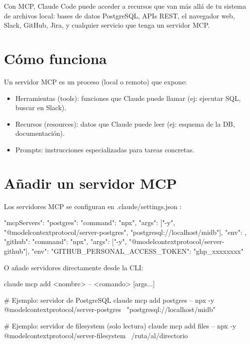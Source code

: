 \documentclass[11pt,a4paper]{book}
\begin{document}
Con MCP, Claude Code puede acceder a recursos que van más allá de tu sistema de archivos local: bases de datos PostgreSQL, APIs REST, el navegador web, Slack, GitHub, Jira, y cualquier servicio que tenga un servidor MCP.

\section{Cómo funciona}
Un servidor MCP es un proceso (local o remoto) que expone:

\begin{itemize}\item Herramientas (tools): funciones que Claude puede llamar (ej: ejecutar SQL, buscar en Slack).\end{itemize}
\begin{itemize}\item Recursos (resources): datos que Claude puede leer (ej: esquema de la DB, documentación).\end{itemize}
\begin{itemize}\item Prompts: instrucciones especializadas para tareas concretas.\end{itemize}
\section{Añadir un servidor MCP}
Los servidores MCP se configuran en .claude/settings.json :

\begin{codebox}
{
  "mcpServers": {
    "postgres": {
      "command": "npx",
      "args": ["-y", "@modelcontextprotocol/server-postgres",
               "postgresql://localhost/midb"],
      "env": {}
    },
    "github": {
      "command": "npx",
      "args": ["-y", "@modelcontextprotocol/server-github"],
      "env": {
        "GITHUB_PERSONAL_ACCESS_TOKEN": "ghp_xxxxxxxx"
      }
    }
  }
}
\end{codebox}
O añade servidores directamente desde la CLI:

\begin{codebox}
claude mcp add <nombre> -- <comando> [args...]

# Ejemplo: servidor de PostgreSQL
claude mcp add postgres -- npx -y @modelcontextprotocol/server-postgres \
  "postgresql://localhost/midb"

# Ejemplo: servidor de filesystem (solo lectura)
claude mcp add files -- npx -y @modelcontextprotocol/server-filesystem \
  /ruta/al/directorio
\end{codebox}
\end{document}
